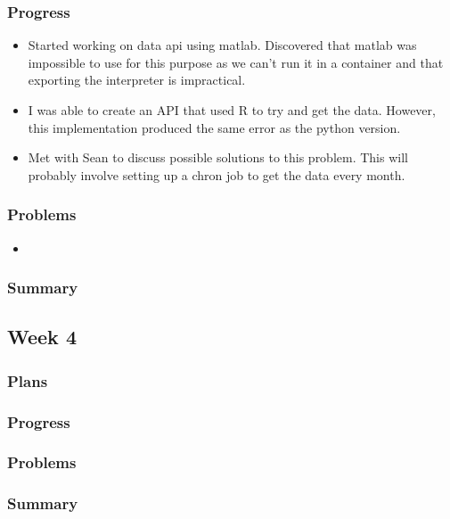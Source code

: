\documentclass[onecolumn, draftclsnofoot,10pt, compsoc]{article}
\begin{document}
			\subsubsection{Progress}
			    \begin{itemize}
			        \item Started working on data api using matlab. Discovered that matlab was impossible to use for this purpose as we can't run it in a container and that exporting the interpreter is impractical.\\
			        \item I was able to create an API that used R to try and get the data. However, this implementation produced the same error as the python version.
			        \item Met with Sean to discuss possible solutions to this problem. This will probably involve setting up a chron job to get the data every month.\\
			    \end{itemize}
			\subsubsection{Problems}
			    \begin{itemize}
			        \item 
			    \end{itemize}
			\subsubsection{Summary}
			
		\subsection{Week 4}
			\subsubsection{Plans}
			
			\subsubsection{Progress}
			
			\subsubsection{Problems}
			
			\subsubsection{Summary}
			
\end{document}
